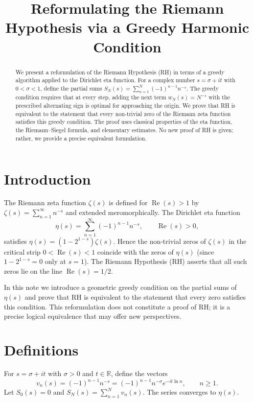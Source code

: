 \documentclass[12pt,a4paper]{article}
\title{Reformulating the Riemann Hypothesis via a Greedy Harmonic Condition}
\author{}
\date{}
\begin{document}
\maketitle

\begin{abstract}
We present a reformulation of the Riemann Hypothesis (RH) in terms of a greedy algorithm applied to the Dirichlet eta function. For a complex number $s=\sigma+it$ with $0<\sigma<1$, define the partial sums $S_N(s)=\sum_{n=1}^N (-1)^{n-1}n^{-s}$. The greedy condition requires that at every step, adding the next term $w_N(s)=N^{-s}$ with the prescribed alternating sign is optimal for approaching the origin. We prove that RH is equivalent to the statement that every non‑trivial zero of the Riemann zeta function satisfies this greedy condition. The proof uses classical properties of the eta function, the Riemann–Siegel formula, and elementary estimates. No new proof of RH is given; rather, we provide a precise equivalent formulation.
\end{abstract}

\section{Introduction}

The Riemann zeta function $\zeta(s)$ is defined for $\operatorname{Re}(s)>1$ by $\zeta(s)=\sum_{n=1}^\infty n^{-s}$ and extended meromorphically. The Dirichlet eta function
\[
\eta(s)=\sum_{n=1}^\infty (-1)^{n-1}n^{-s},\qquad \operatorname{Re}(s)>0,
\]
satisfies $\eta(s)=(1-2^{1-s})\zeta(s)$. Hence the non‑trivial zeros of $\zeta(s)$ in the critical strip $0<\operatorname{Re}(s)<1$ coincide with the zeros of $\eta(s)$ (since $1-2^{1-s}=0$ only at $s=1$). The Riemann Hypothesis (RH) asserts that all such zeros lie on the line $\operatorname{Re}(s)=1/2$.

In this note we introduce a geometric greedy condition on the partial sums of $\eta(s)$ and prove that RH is equivalent to the statement that every zero satisfies this condition. This reformulation does not constitute a proof of RH; it is a precise logical equivalence that may offer new perspectives.

\section{Definitions}

For $s=\sigma+it$ with $\sigma>0$ and $t\in\mathbb{R}$, define the vectors
\[
v_n(s)=(-1)^{n-1}n^{-s}=(-1)^{n-1}n^{-\sigma}e^{-it\ln n},\qquad n\ge1.
\]
Let $S_0(s)=0$ and $S_N(s)=\sum_{n=1}^N v_n(s)$. The series converges to $\eta(s)$.
\end{document}
